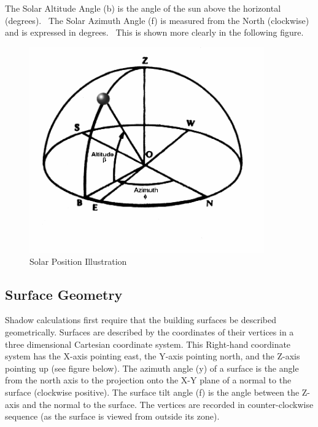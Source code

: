 The Solar Altitude Angle (b) is the angle of the sun above the horizontal (degrees).~ The Solar Azimuth Angle (f) is measured from the North (clockwise) and is expressed in degrees.~ This is shown more clearly in the following figure.

\begin{figure}[hbtp] %
\centering
\includegraphics[width=0.9\textwidth, height=0.9\textheight, keepaspectratio=true]{media/image604.png}
\caption{  Solar Position Illustration \protect \label{fig:solar-position-illustration}}
\end{figure}

\subsection{Surface Geometry}\label{surface-geometry}

Shadow calculations first require that the building surfaces be described geometrically. Surfaces are described by the coordinates of their vertices in a three dimensional Cartesian coordinate system. This Right-hand coordinate system has the X-axis pointing east, the Y-axis pointing north, and the Z-axis pointing up (see figure below). The azimuth angle (y) of a surface is the angle from the north axis to the projection onto the X-Y plane of a normal to the surface (clockwise positive). The surface tilt angle (f) is the angle between the Z-axis and the normal to the surface. The vertices are recorded in counter-clockwise sequence (as the surface is viewed from outside its zone).

